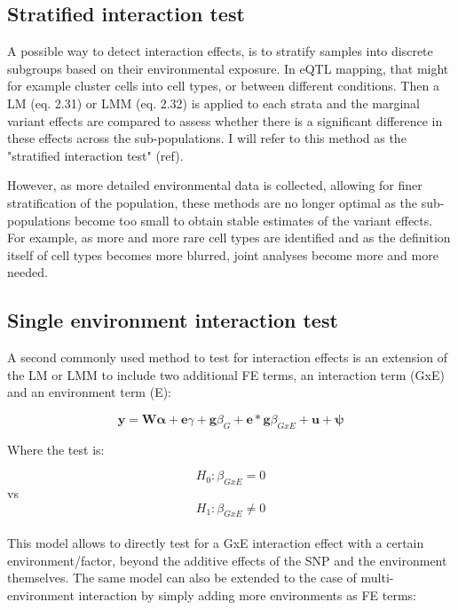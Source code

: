 \subsection{Stratified interaction test}

A possible way to detect interaction effects, is to stratify samples into discrete subgroups based on their environmental exposure.
In eQTL mapping, that might for example cluster cells into cell types, or between different conditions.
Then a LM (eq. 2.31) or LMM (eq. 2.32) is applied to each strata and the marginal variant effects are compared to assess whether there is a significant difference in these effects across the sub-populations.
I will refer to this method as the "stratified interaction test" (ref).

However, as more detailed environmental data is collected, allowing for finer stratification of the population, these methods are no longer optimal as the sub-populations become too small to obtain stable estimates of the variant effects.
For example, as more and more rare cell types are identified and as the definition itself of cell types becomes more blurred, joint analyses become more and more needed. 

\subsection{Single environment interaction test}

A second commonly used method to test for interaction effects is an extension of the LM or LMM to include two additional FE terms, an interaction term (GxE) and an environment term (E):

\begin{equation}\label{eq22:Interaction_test_FE_LMM}
 \mathbf{y} =  \mathbf{W}\boldsymbol{\alpha} + \mathbf{e}\gamma  + \mathbf{g}\beta_G + \mathbf{e}*\mathbf{g}\beta_{GxE} + \mathbf{u} + \boldsymbol{\psi} 
\end{equation}

Where the test is:

\begin{equation}
 H_{0}: \beta_{GxE}=0 
\end{equation}
vs
\begin{equation}
 H_{1}: \beta_{GxE} \neq 0 
\end{equation}\\

This model allows to directly test for a GxE interaction effect with a certain environment/factor, beyond the additive effects of the SNP and the environment themselves. 
The same model can also be extended to the case of multi-environment interaction by simply adding more environments as FE terms:

